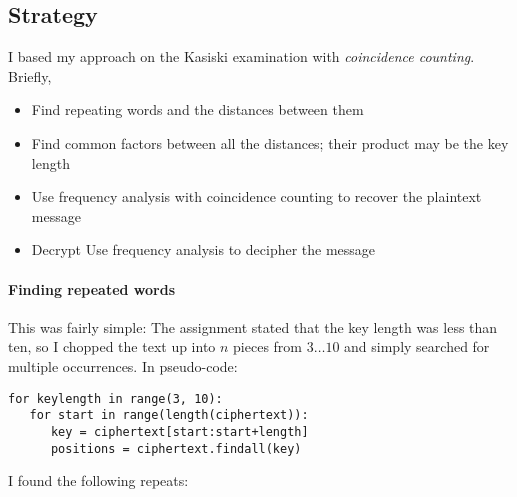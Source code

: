 \documentclass[a4paper,english,12pt]{article}
\begin{document}
\subsection{Strategy}

I based my approach on the Kasiski examination\cite{dalkilic2000interactive,
wiki:kasiski.examination} with \textit{coincidence
counting}\cite{coincidence.friedman}. Briefly,

\begin{itemize}
  \item Find repeating words and the distances between them
  \item Find common factors between all the distances; their product may be the
    key length
  \item Use frequency analysis with coincidence counting to recover the
    plaintext message
  \item Decrypt Use frequency analysis to decipher the message
\end{itemize}

\paragraph{Finding repeated words}

This was fairly simple: The assignment stated that the key length was less than
ten, so I chopped the text up into $n$ pieces from $3\dots10$ and simply
searched for multiple occurrences. In pseudo-code:

\begin{verbatim}
for keylength in range(3, 10):
   for start in range(length(ciphertext)):
      key = ciphertext[start:start+length]
      positions = ciphertext.findall(key)
\end{verbatim}

I found the following repeats:
\end{document}
